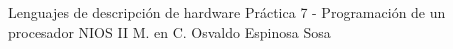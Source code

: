 




	\pnormal
	{Lenguajes de descripción de hardware}
	{Práctica 7  - Programación de un procesador NIOS II}
	{M. en C. Osvaldo Espinosa Sosa}
	\tableofcontents
	
	\newpage 
	\newpage 
	\clearpage 
	\newpage 
	
	\newpage 



